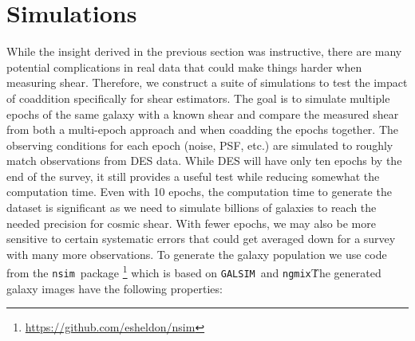 \documentclass[fleqn,useAMS,usenatbib]{mnras}
\newcommand{\galsim}{\texttt{GALSIM}}
\newcommand{\ngmix}{\texttt{ngmix}}
\newcommand{\nnsim}{\texttt{nsim}}
\begin{document}
\section{Simulations}
\label{Section:Simulation}
While the insight derived in the previous section was instructive, there are 
many potential complications in real data that could make things harder when 
measuring shear.  Therefore, we construct a suite of simulations to test the 
impact of coaddition specifically for shear estimators.  The goal is to 
simulate multiple epochs of the same galaxy with a known shear and compare the 
measured shear from both a multi-epoch approach and when coadding the epochs 
together.  The observing conditions for each epoch (noise, PSF, etc.) are 
simulated to roughly match observations from DES data.  While DES will have 
only ten epochs by the end of the survey, it still provides a useful test while 
reducing somewhat the computation time.  Even with 10 epochs, the computation 
time to generate the dataset is significant as we need to simulate billions of 
galaxies to reach the needed precision for cosmic shear.  With fewer epochs, we 
may also be more sensitive to certain systematic errors that could get averaged 
down for a survey with many more observations.
To generate the galaxy population we use code from the \nnsim\ package 
\footnote{\url{https://github.com/esheldon/nsim}} which is based on \galsim\ 
and \ngmix\.  The generated galaxy images have the following properties:
\end{document}
